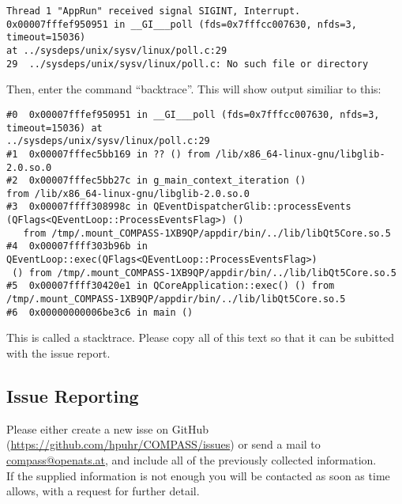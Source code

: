 \begin{verbatim}
Thread 1 "AppRun" received signal SIGINT, Interrupt.
0x00007fffef950951 in __GI___poll (fds=0x7fffcc007630, nfds=3, timeout=15036) 
at ../sysdeps/unix/sysv/linux/poll.c:29
29	../sysdeps/unix/sysv/linux/poll.c: No such file or directory
\end{verbatim}

Then, enter the command ``backtrace''. This will show output similiar to this:

\begin{verbatim}
#0  0x00007fffef950951 in __GI___poll (fds=0x7fffcc007630, nfds=3, timeout=15036) at 
../sysdeps/unix/sysv/linux/poll.c:29
#1  0x00007fffec5bb169 in ?? () from /lib/x86_64-linux-gnu/libglib-2.0.so.0
#2  0x00007fffec5bb27c in g_main_context_iteration () 
from /lib/x86_64-linux-gnu/libglib-2.0.so.0
#3  0x00007ffff308998c in QEventDispatcherGlib::processEvents
(QFlags<QEventLoop::ProcessEventsFlag>) ()
   from /tmp/.mount_COMPASS-1XB9QP/appdir/bin/../lib/libQt5Core.so.5
#4  0x00007ffff303b96b in QEventLoop::exec(QFlags<QEventLoop::ProcessEventsFlag>)
 () from /tmp/.mount_COMPASS-1XB9QP/appdir/bin/../lib/libQt5Core.so.5
#5  0x00007ffff30420e1 in QCoreApplication::exec() () from 
/tmp/.mount_COMPASS-1XB9QP/appdir/bin/../lib/libQt5Core.so.5
#6  0x00000000006be3c6 in main ()
\end{verbatim}

This is called a stacktrace. Please copy all of this text so that it can be subitted with the issue report.


\subsection{Issue Reporting}

Please either create a new isse on GitHub (\url{https://github.com/hpuhr/COMPASS/issues}) or send a mail to \href{mailto:compass@openats.at}{compass@openats.at}, and include all of the previously collected information. \\

If the supplied information is not enough you will be contacted as soon as time allows, with a request for further detail.


